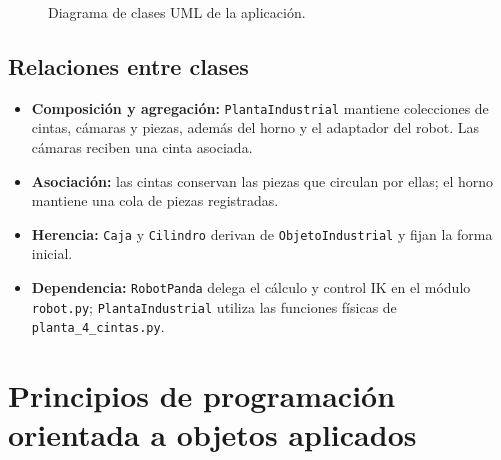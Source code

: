 \documentclass[12pt,a4paper]{article}
\begin{document}
\begin{landscape}
\begin{figure}[H]
    \caption{Diagrama de clases UML de la aplicación.}
    \label{fig:uml}
\end{figure}
\end{landscape}

\subsection{Relaciones entre clases}

\begin{itemize}
    \item \textbf{Composición y agregación:} \texttt{PlantaIndustrial} mantiene colecciones de cintas, cámaras y piezas, además del horno y el adaptador del robot. Las cámaras reciben una cinta asociada.
    \item \textbf{Asociación:} las cintas conservan las piezas que circulan por ellas; el horno mantiene una cola de piezas registradas.
    \item \textbf{Herencia:} \texttt{Caja} y \texttt{Cilindro} derivan de \texttt{ObjetoIndustrial} y fijan la forma inicial.
    \item \textbf{Dependencia:} \texttt{RobotPanda} delega el cálculo y control IK en el módulo \texttt{robot.py}; \texttt{PlantaIndustrial} utiliza las funciones físicas de \texttt{planta\_4\_cintas.py}.
\end{itemize}


\section{Principios de programación orientada a objetos aplicados}
\end{document}
